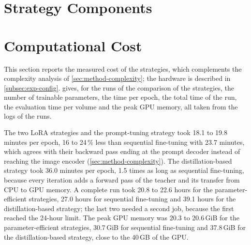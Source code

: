 
\section{Strategy Components}
\label{sec:exp-components}

\section{Computational Cost}
\label{sec:exp-compute}
This section reports the measured cost of the strategies, which complements the complexity analysis of \cref{sec:method-complexity}; the hardware is described in \cref{subsec:exp-config}.
 gives, for the runs of the comparison of the strategies, the number of trainable parameters, the time per epoch, the total time of the run, the evaluation time per volume and the peak GPU memory, all taken from the logs of the runs.

\begin{table}[tb]
\centering
\caption[Measured cost of the strategies]{Measured cost of the strategies in the comparison (full training split, original task order, one NVIDIA A100 40\,GB). Trainable param.: parameters set as trainable, in millions; of the 440.03 million of sequential fine-tuning and the distillation-based strategy, 339.29 million receive gradients (\cref{subsec:method-seqft}). Epoch: mean wall-clock time of one training epoch including validation. Wall-clock: total time of all jobs of the run, including the evaluation of the protocol and restarts after the 24-hour limit. Evaluation: median time per test volume, including data loading and text encoding. Peak GPU mem.: maximum over all jobs of the run.}
\label{tab:ch6_compute}

\end{table}

The two LoRA strategies and the prompt-tuning strategy took 18.1 to 19.8 minutes per epoch, 16 to 24\,\% less than sequential fine-tuning with 23.7 minutes, which agrees with their backward pass ending at the prompt decoder instead of reaching the image encoder (\cref{sec:method-complexity}).
The distillation-based strategy took 36.0 minutes per epoch, 1.5 times as long as sequential fine-tuning, because every iteration adds a forward pass of the teacher and its transfer from CPU to GPU memory.
A complete run took 20.8 to 22.6 hours for the parameter-efficient strategies, 27.0 hours for sequential fine-tuning and 39.1 hours for the distillation-based strategy; the last two needed a second job, because the first reached the 24-hour limit.
The peak GPU memory was 20.3 to 20.6\,GiB for the parameter-efficient strategies, 30.7\,GiB for sequential fine-tuning and 37.8\,GiB for the distillation-based strategy, close to the 40\,GB of the GPU.

